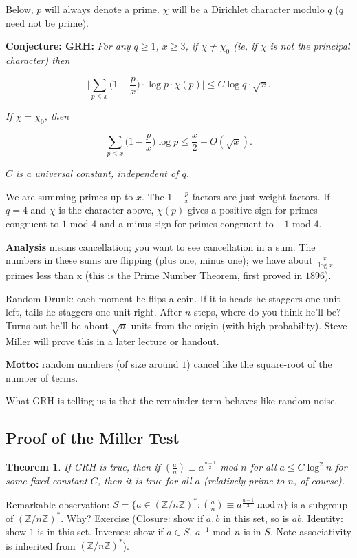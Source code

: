 \documentclass[12pt,letterpaper]{report}
\newcommand\be{\begin{equation}}
\newcommand\ee{\end{equation}}
\newcommand{\Z}{\ensuremath{\mathbb{Z}}}
\newcommand{\ZnZf}{ (\Z / n\Z)^{*}}
\newcommand\lag[2]{\ensuremath{\left(\frac{#1}{#2}\right)}}
\newtheorem{thm}{Theorem}[section]
\begin{document}
Below, $p$ will always denote a prime. $\chi$ will be a Dirichlet
character modulo $q$ ($q$ need not be prime).

\textbf{Conjecture: GRH:} \emph{For any $q \ge 1$, $x \ge 3$, if
$\chi \neq \chi_0$ (ie, if $\chi$ is not the principal character)
then}

\be \Big| \sum_{p \le x} \Big(1 - \frac{p}{x} \Big) \cdot \log p
\cdot \chi(p) \Big| \le C \log q \cdot \sqrt{x}. \ee

\emph{If $\chi = \chi_0$, then}

\be \sum_{p \le x} \Big(1 - \frac{p}{x} \Big) \log p \le
\frac{x}{2} + O(\sqrt{x}). \ee

\emph{$C$ is a universal constant, independent of $q$.}

We are summing primes up to $x$. The $1 - \frac{p}{x}$ factors are
just weight factors. If $q = 4$ and $\chi$ is the character above,
$\chi(p)$ gives a positive sign for primes congruent to $1$ mod
$4$ and a minus sign for primes congruent to $-1$ mod $4$.

\textbf{Analysis} means cancellation; you want to see cancellation
in a sum. The numbers in these sums are flipping (plus one, minus
one); we have about $\frac{x}{\log x}$ primes less than x (this is
the Prime Number Theorem, first proved in $1896$).

Random Drunk: each moment he flips a coin. If it is heads he
staggers one unit left, tails he staggers one unit right. After
$n$ steps, where do you think he'll be? Turns out he'll be about
$\sqrt{n}$ units from the origin (with high probability). Steve
Miller will prove this in a later lecture or handout.

\textbf{Motto:} random numbers (of size around $1$) cancel like
the square-root of the number of terms.

What GRH is telling us is that the remainder term behaves like
random noise.

\subsection{Proof of the Miller Test}

\begin{thm}If GRH is true, then if $\lag{a}{n} \equiv a^{\frac{n-1}{2}}$ mod
$n$ for all $a \le C \log^2 n$ for some fixed constant $C$, then
it is true for all $a$ (relatively prime to $n$, of course).
\end{thm}

Remarkable observation: $S = \{a \in \ZnZf: \lag{a}{n} \equiv
a^{\frac{n-1}{2}} \ \mbox{mod} \ n\}$ is a subgroup of $\ZnZf$.
Why? Exercise (Closure: show if $a, b$ in this set, so is $ab$.
Identity: show $1$ is in this set. Inverses: show if $a \in S$,
$a^{-1}$ mod $n$ is in $S$. Note associativity is inherited from
$\ZnZf$).
\end{document}
